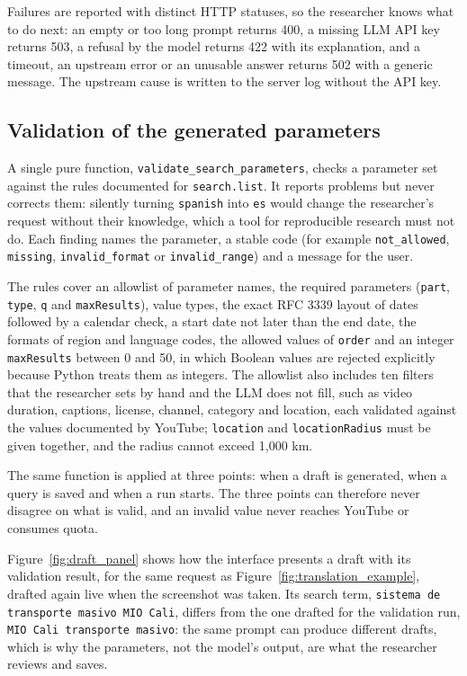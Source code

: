 Failures are reported with distinct HTTP statuses, so the researcher knows what to do next: an empty or too long prompt returns 400, a missing LLM API key returns 503, a refusal by the model returns 422 with its explanation, and a timeout, an upstream error or an unusable answer returns 502 with a generic message. The upstream cause is written to the server log without the API key.

\subsection{Validation of the generated parameters}

A single pure function, \texttt{validate\_\allowbreak search\_\allowbreak parameters}, checks a parameter set against the rules documented for \texttt{search.\allowbreak list}. It reports problems but never corrects them: silently turning \texttt{spanish} into \texttt{es} would change the researcher's request without their knowledge, which a tool for reproducible research must not do. Each finding names the parameter, a stable code (for example \texttt{not\_\allowbreak allowed}, \texttt{missing}, \texttt{invalid\_\allowbreak format} or \texttt{invalid\_\allowbreak range}) and a message for the user.

The rules cover an allowlist of parameter names, the required parameters (\texttt{part}, \texttt{type}, \texttt{q} and \texttt{maxResults}), value types, the exact RFC 3339 layout of dates followed by a calendar check, a start date not later than the end date, the formats of region and language codes, the allowed values of \texttt{order} and an integer \texttt{maxResults} between 0 and 50, in which Boolean values are rejected explicitly because Python treats them as integers. The allowlist also includes ten filters that the researcher sets by hand and the LLM does not fill, such as video duration, captions, license, channel, category and location, each validated against the values documented by YouTube; \texttt{location} and \texttt{locationRadius} must be given together, and the radius cannot exceed 1,000 km.

The same function is applied at three points: when a draft is generated, when a query is saved and when a run starts. The three points can therefore never disagree on what is valid, and an invalid value never reaches YouTube or consumes quota.

Figure~\ref{fig:draft_panel} shows how the interface presents a draft with its validation result, for the same request as Figure~\ref{fig:translation_example}, drafted again live when the screenshot was taken. Its search term, \texttt{sistema de transporte masivo MIO Cali}, differs from the one drafted for the validation run, \texttt{MIO Cali transporte masivo}: the same prompt can produce different drafts, which is why the parameters, not the model's output, are what the researcher reviews and saves.

